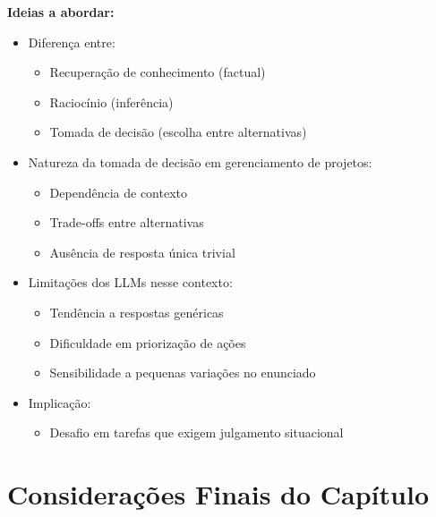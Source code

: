 \textbf{Ideias a abordar:}
\begin{itemize}
    \item Diferença entre:
    \begin{itemize}
        \item Recuperação de conhecimento (factual)
        \item Raciocínio (inferência)
        \item Tomada de decisão (escolha entre alternativas)
    \end{itemize}
    \item Natureza da tomada de decisão em gerenciamento de projetos:
    \begin{itemize}
        \item Dependência de contexto
        \item Trade-offs entre alternativas
        \item Ausência de resposta única trivial
    \end{itemize}
    \item Limitações dos LLMs nesse contexto:
    \begin{itemize}
        \item Tendência a respostas genéricas
        \item Dificuldade em priorização de ações
        \item Sensibilidade a pequenas variações no enunciado
    \end{itemize}
    \item Implicação:
    \begin{itemize}
        \item Desafio em tarefas que exigem julgamento situacional
    \end{itemize}
\end{itemize}





\section{Considerações Finais do Capítulo}
\label{subsec:fund_final}

